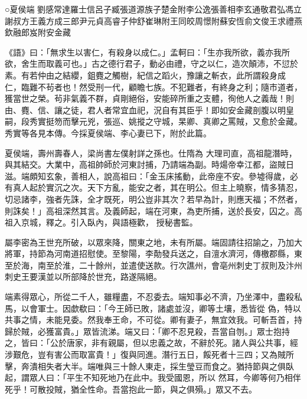
\begin{pinyinscope}

 ○夏侯端
 劉感常達羅士信呂子臧張道源族子楚金附李公逸張善相李玄通敬君弘馮立
 謝叔方王義方成三郎尹元貞高睿子仲舒崔琳附王同皎周憬附蘇安恆俞文俊王求禮燕欽融郎岌附安金藏



 《語》曰：「無求生以害仁，有殺身以成仁。」孟軻曰：「生亦我所欲，義亦我所欲，舍生而取義可也。」古之德行君子，動必由禮，守之以仁，造次顛沛，不愆於素。有若仲由之結纓，鉏麑之觸樹，紀信之蹈火，豫讓之斬衣，此所謂殺身成
 仁，臨難不茍者也！然受刑一代，顧瞻七族。不犯難者，有終身之利；隨市道者，獲當世之榮。茍非氣義不群，貞剛絕俗，安能碎所重之支體，徇他人之義哉！則由、麑、信、讓之徒，君人者常宜血祀，況自有其臣乎！即如安金藏剖腹以明皇嗣，段秀實挺笏而擊元兇，張巡、姚摐之守城，杲卿、真卿之罵賊，又愈於金藏。秀實等各見本傳。今採夏侯端、李心妻已下，附於此篇。



 夏侯端，壽州壽春人，梁尚書左僕射詳之孫也。仕隋為
 大理司直，高祖龍潛時，與其結交。大業中，高祖帥師於河東討捕，乃請端為副。時煬帝幸江都，盜賊日滋。端頗知玄象，善相人，說高祖曰：「金玉床搖動，此帝座不安。參墟得歲，必有真人起於實沉之次。天下方亂，能安之者，其在明公。但主上曉察，情多猜忍，切忌諸李，強者先誅，全才既死，明公豈非其次？若早為計，則應天福；不然者，則誅矣！」高祖深然其言。及義師起，端在河東，為吏所捕，送於長安，囚之。高祖入京城，釋之。引入臥內，與語極歡，
 授秘書監。



 屬李密為王世充所破，以眾來降，關東之地，未有所屬。端固請往招諭之，乃加大將軍，持節為河南道招慰使。至黎陽，李勣發兵送之，自澶水濟河，傳檄郡縣，東至於海，南至於淮，二十餘州，並遣使送款。行次譙州，會亳州刺史丁叔則及汴州刺史王要漢並以所部降於世充，路遂隔絕。



 端素得眾心，所從二千人，雖糧盡，不忍委去。端知事必不濟，乃坐澤中，盡殺私馬，以會軍士。因歔欷曰：「今王師已敗，諸處並沒，卿等土壤，悉皆從
 偽，特以共事之情，未能見委。然我奉王命，不可從。卿有妻子，無宜效我。可斬吾首，持歸於賊，必獲富貴。」眾皆流涕。端又曰：「卿不忍見殺，吾當自刎。」眾士抱持之，皆曰：「公於唐家，非有親屬，但以忠義之故，不辭於死。諸人與公共事，經涉艱危，豈有害公而取富貴！」復與同進。潛行五日，餒死者十三四；又為賊所擊，奔潰相失者大半。端唯與三十餘人東走，採生瑩豆而食之。猶持節與之俱臥起，謂眾人曰：「平生不知死地乃在此中。我受國恩，所以
 然耳，今卿等何乃相伴死乎！可散投賊，猶全性命。吾當抱此一節，與之俱殞。」眾又不去。




\end{pinyinscope}
